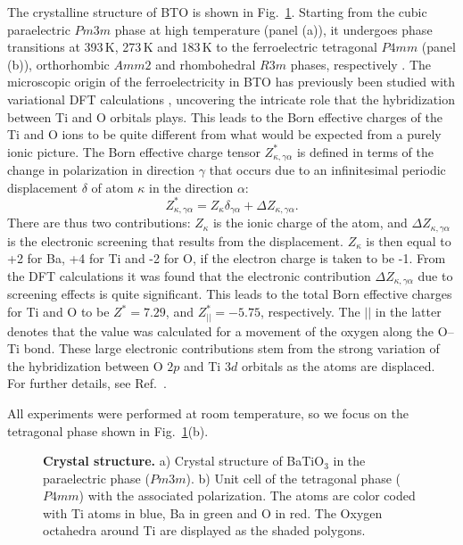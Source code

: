 The crystalline structure of BTO is shown in Fig.~\ref{fig:BTO_crystal}.
Starting from the cubic paraelectric $Pm3m$ phase at high temperature (panel (a)), it undergoes phase transitions at 393\,K, 273\,K and 183\,K to the ferroelectric tetragonal $P4mm$ (panel (b)), orthorhombic $Amm2$ and rhombohedral $R3m$ phases, respectively \cite{Mason1948, VonHippel1950, Marton2010}.
The microscopic origin of the ferroelectricity in BTO has previously been studied with variational DFT calculations \cite{Ghosez1995}, uncovering the intricate role that the hybridization between Ti and O orbitals plays.
This leads to the Born effective charges of the Ti and O ions to be quite different from what would be expected from a purely ionic picture.
The Born effective charge tensor $Z^*_{\kappa, \gamma\alpha}$ is defined in terms of the change in polarization in direction $\gamma$ that occurs due to an infinitesimal periodic displacement $\delta$ of atom $\kappa$ in the direction $\alpha$:
\begin{equation}
Z^*_{\kappa, \gamma\alpha} = Z_{\kappa} \delta_{\gamma\alpha} + \Delta Z_{\kappa, \gamma\alpha}.
\end{equation}
There are thus two contributions: $Z_{\kappa}$ is the ionic charge of the atom, and $\Delta Z_{\kappa, \gamma\alpha}$ is the electronic screening that results from the displacement.
$Z_{\kappa}$ is then equal to +2 for Ba, +4 for Ti and -2 for O, if the electron charge is taken to be -1.
From the DFT calculations it was found that the electronic contribution $\Delta Z_{\kappa, \gamma\alpha}$ due to screening effects is quite significant.
This leads to the total Born effective charges for Ti and O to be $Z^* = 7.29$, and $Z^*_{||} = -5.75$, respectively.
The $||$ in the latter denotes that the value was calculated for a movement of the oxygen along the O--Ti bond.
These large electronic contributions stem from the strong variation of the hybridization between O $2p$ and Ti $3d$ orbitals as the atoms are displaced.
For further details, see Ref.~\cite{Ghosez1995}.

All experiments were performed at room temperature, so we focus on the tetragonal phase shown in Fig.~\ref{fig:BTO_crystal}(b).
\begin{figure}[h]
	\caption{\label{fig:BTO_crystal}{\bf Crystal structure.} a) Crystal structure of BaTiO$_3$ in the paraelectric phase ($Pm3m$). b) Unit cell of the tetragonal phase ($P4mm$) with the associated polarization. The atoms are color coded with Ti atoms in blue, Ba in green and O in red. The Oxygen octahedra around Ti are displayed as the shaded polygons.}
\end{figure}


